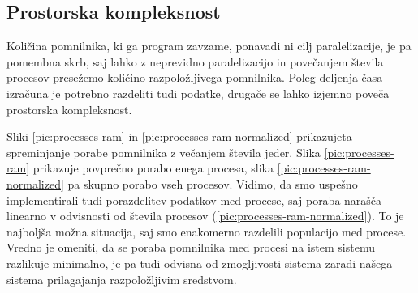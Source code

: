 \documentclass[a4paper,12pt]{book}
\begin{document}
\subsection{Prostorska kompleksnost}
Količina pomnilnika, ki ga program zavzame, ponavadi ni cilj paralelizacije, je pa pomembna skrb, saj lahko z neprevidno paralelizacijo in povečanjem števila procesov presežemo količino razpoložljivega pomnilnika. Poleg deljenja časa izračuna je potrebno razdeliti tudi podatke, drugače se lahko izjemno poveča prostorska kompleksnost. 

Sliki \ref{pic:processes-ram} in \ref{pic:processes-ram-normalized} prikazujeta spreminjanje porabe pomnilnika z večanjem števila jeder. Slika \ref{pic:processes-ram} prikazuje povprečno porabo enega procesa, slika \ref{pic:processes-ram-normalized} pa skupno porabo vseh procesov. Vidimo, da smo uspešno implementirali tudi porazdelitev podatkov med procese, saj poraba narašča linearno v odvisnosti od števila procesov (\ref{pic:processes-ram-normalized}). To je najboljša možna situacija, saj smo enakomerno razdelili populacijo med procese. Vredno je omeniti, da se poraba pomnilnika med procesi na istem sistemu razlikuje minimalno, je pa tudi odvisna od zmogljivosti sistema zaradi našega sistema prilagajanja razpoložljivim sredstvom. 
\end{document}
